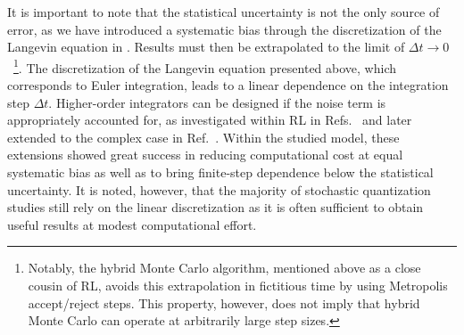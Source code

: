 \documentclass[../main.tex]{subfiles}
\begin{document}
It is important to note that the statistical uncertainty is not the only source of error, as we have introduced a systematic bias through the discretization of the Langevin equation in . Results must then be extrapolated to the limit of $\Delta t\to 0$~\footnote{Notably, the hybrid Monte Carlo algorithm, mentioned above as a close cousin of RL, avoids this extrapolation in fictitious time by using Metropolis accept/reject steps. This property, however, does not imply that hybrid Monte Carlo can operate at arbitrarily large step sizes.}. The discretization of the Langevin equation presented above, which corresponds to Euler integration, leads to a linear dependence on the integration step $\Delta t$. Higher-order integrators can be designed if the noise term is appropriately accounted for, as investigated within RL in Refs.~\cite{DRUMMOND1983119, HOROWITZ1987510, CATTERALL1991177} and later extended to the complex case in Ref.~\cite{Aarts2012SU3}. Within the studied model, these extensions showed great success in reducing computational cost at equal systematic bias as well as to bring finite-step dependence below the statistical uncertainty. It is noted, however, that the majority of stochastic quantization studies still rely on the linear discretization as it is often sufficient to obtain useful results at modest computational effort.
%
\end{document}

